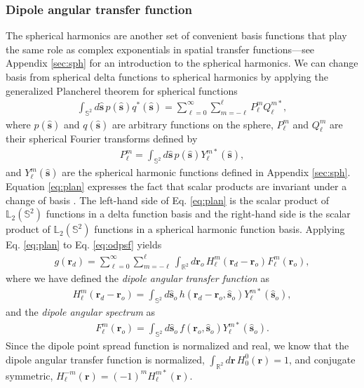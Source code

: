 \documentclass[]{osa-article}
\providecommand{\mb}[1]{\mathbf{#1}}
\providecommand{\ro}{\mathbf{\mathbf{r}}_o}
\providecommand{\so}{\mathbf{\hat{s}}_o}
\providecommand{\rd}{\mathbf{r}_d}
\providecommand{\mh}[1]{\mathbf{\hat{#1}}}
\providecommand{\mbb}[1]{\mathbb{#1}}
\providecommand{\lmsum}{\sum_{\ell=0}^\infty\sum_{m=-\ell}^{\ell}}
\providecommand{\ints}[1]{\int_{\mbb{S}^{#1}}}
\begin{document}
\subsubsection{Dipole angular transfer function}
The spherical harmonics are another set of convenient basis functions that play
the same role as complex exponentials in spatial transfer functions---see
Appendix \ref{sec:sph} for an introduction to the spherical harmonics. We can
change basis from spherical delta functions to spherical harmonics by applying
the generalized Plancherel theorem for spherical functions
\begin{align}
  \ints{2}d\mh{s}\, p(\mh{s})q^*(\mh{s}) = \lmsum P_\ell^m Q_\ell^{m*}, \label{eq:plan}
\end{align}
where $p(\mh{s})$ and $q(\mh{s})$ are arbitrary functions on the sphere,
$P_\ell^m$ and $Q_\ell^m$ are their spherical Fourier transforms defined by
\begin{align}
  P_\ell^m = \int_{\mbb{S}^2}d\mh{s}\, p(\mh{s})Y_\ell^{m*}(\mh{s}),
\end{align}
and $Y_{\ell}^m(\mh{s})$ are the spherical harmonic functions defined in
Appendix \ref{sec:sph}. Equation \eqref{eq:plan} expresses the fact that scalar
products are invariant under a change of basis \cite[Eq.~3.78]{barrett2004}.
The left-hand side of Eq. \eqref{eq:plan} is the scalar product of
$\mbb{L}_2(\mbb{S}^2)$ functions in a delta function basis and the right-hand
side is the scalar product of $\mbb{L}_2(\mbb{S}^2)$ functions in a spherical
harmonic function basis. Applying Eq. \eqref{eq:plan} to Eq. \eqref{eq:odpsf} yields
\begin{align}
  g(\rd) = \lmsum \int_{\mbb{R}^2}d\ro\, H_\ell^m(\rd - \ro)F_\ell^m(\ro), \label{eq:atf-form}
\end{align}
where we have defined the \textit{dipole angular transfer function} as
\begin{align}
  H_\ell^m(\rd - \ro) = \int_{\mbb{S}^2}d\so\, h(\rd - \ro, \so)Y_{\ell}^{m*}(\so),\label{eq:atf-prep} 
\end{align}
and the \textit{dipole angular spectrum} as
\begin{align}
  F_\ell^m(\ro) = \int_{\mbb{S}^2}d\so\, f(\ro, \so)Y_{\ell}^{m*}(\so).
\end{align}
Since the dipole point spread function is normalized and real, we know
that the dipole angular transfer function is normalized,
$\int_{\mbb{R}^2}d\mb{r}\, H_0^0(\mb{r}) = 1$, and conjugate symmetric,
$H_\ell^{-m}(\mb{r}) = (-1)^mH_\ell^{m*}(\mb{r})$.
\end{document}
